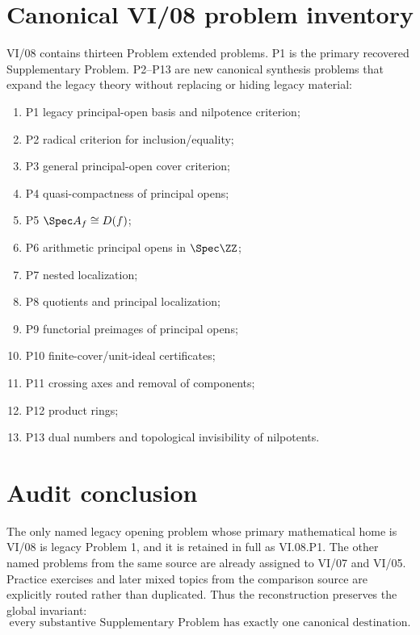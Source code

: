 \section*{Canonical VI/08 problem inventory}
VI/08 contains thirteen Problem extended problems.  P1 is the primary recovered Supplementary Problem.
P2--P13 are new canonical synthesis problems that expand the legacy theory without replacing
or hiding legacy material:
\begin{enumerate}
\item P1 legacy principal-open basis and nilpotence criterion;
\item P2 radical criterion for inclusion/equality;
\item P3 general principal-open cover criterion;
\item P4 quasi-compactness of principal opens;
\item P5 $\Spec A_f\cong D(f)$;
\item P6 arithmetic principal opens in $\Spec\ZZ$;
\item P7 nested localization;
\item P8 quotients and principal localization;
\item P9 functorial preimages of principal opens;
\item P10 finite-cover/unit-ideal certificates;
\item P11 crossing axes and removal of components;
\item P12 product rings;
\item P13 dual numbers and topological invisibility of nilpotents.
\end{enumerate}

\section*{Audit conclusion}
The only named legacy opening problem whose primary mathematical home is VI/08 is legacy
Problem 1, and it is retained in full as VI.08.P1.  The other named problems from the same
source are already assigned to VI/07 and VI/05.  Practice exercises and later mixed topics
from the comparison source are explicitly routed rather than duplicated.  Thus the
reconstruction preserves the global invariant:
\[
\boxed{\text{every substantive Supplementary Problem has exactly one canonical destination}.}
\]
